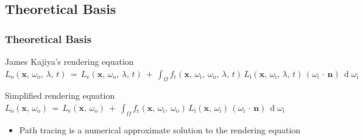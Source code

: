 \documentclass{beamer}
\begin{document}
\subsection{Theoretical Basis}
\begin{frame}
    \frametitle{Theoretical Basis}
    \begin{block}{James Kajiya's rendering equation}
        \scriptsize
        \(
            L_{\text{o}}(\mathbf x,\, \omega_{\text{o}},\, \lambda,\, t) \,=
            \, L_{\text{e}}(\mathbf x,\, \omega_{\text{o}},\, \lambda,\, t) \ +
            \, \int_\Omega f_{\text{r}}(\mathbf x,\, \omega_{\text{i}},\ \omega_{\text{o}},\, \lambda,\, t)
            \, L_{\text{i}}(\mathbf x,\, \omega_{\text{i}},\, \lambda,\, t)\,
            (\omega_{\text{i}}\,\cdot\,\mathbf n)\, \operatorname d \omega_{\text{i}}
        \)
    \end{block}
    \begin{block}{Simplified rendering equation}
        \(
            L_{\text{o}}(\mathbf x,\, \omega_{\text{o}}) \,=
            \, L_{\text{e}}(\mathbf x,\, \omega_{\text{o}}) \ +
            \, \int_\Omega f_{\text{r}}(\mathbf x,\, \omega_{\text{i}},\ \omega_{\text{o}})
            \, L_{\text{i}}(\mathbf x,\, \omega_{\text{i}})\,
            (\omega_{\text{i}}\,\cdot\,\mathbf n)\, \operatorname d \omega_{\text{i}}
        \)
    \end{block}

    \begin{itemize}
        \item Path tracing is a numerical approximate solution to the rendering equation
    \end{itemize}
\end{frame}
\end{document}
